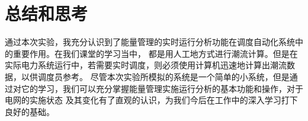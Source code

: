 \documentclass[a4paper]{ctexrep}
\begin{document}
            \section{总结和思考}
                通过本次实验，我充分认识到了能量管理的实时运行分析功能在调度自动化系统中的重要作用。在我们课堂的学习当中，
                都是用人工地方式进行潮流计算。但是在实际电力系统运行中，若需要实时调度，则必须使用计算机迅速地计算出潮流数据，以供调度员参考。
                尽管本次实验所模拟的系统是一个简单的小系统，但是通过对它的学习，我们可以充分掌握能量管理实施运行分析的基本功能和操作，对于电网的实施状态
                及其变化有了直观的认识，为我们今后在工作中的深入学习打下良好的基础。
\end{document}
